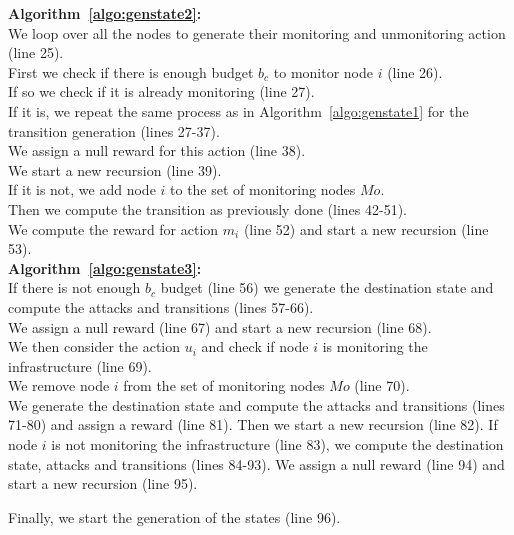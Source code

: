    
\textbf{Algorithm~\ref{algo:genstate2}:}\\
We loop over all the nodes to generate their monitoring and unmonitoring action (line 25).\\
First we check if there is enough budget $b_c$ to monitor node $i$ (line 26).\\
If so we check if it is already monitoring (line 27).\\
If it is, we repeat the same process as in Algorithm~\ref{algo:genstate1} for the transition generation (lines 27-37).\\
We assign a null reward for this action (line 38).\\
We start a new recursion (line 39).\\
If it is not, we add node $i$ to the set of monitoring nodes $Mo$.\\
Then we compute the transition as previously done (lines 42-51).\\
We compute the reward for action $m_i$ (line 52) and start a new recursion (line 53).\\

\textbf{Algorithm~\ref{algo:genstate3}:}\\
If there is not enough $b_c$ budget (line 56) we generate the destination state and compute the attacks and  transitions (lines 57-66).\\
We assign a null reward (line 67) and start a new recursion (line 68).\\
We then consider the action $u_i$ and check if node $i$ is monitoring the infrastructure (line 69). \\
We remove node $i$ from the set of monitoring nodes $Mo$ (line 70).\\
We generate the destination state and compute the attacks and transitions (lines 71-80) and assign a reward (line 81).
Then we start a new recursion (line 82).
If node $i$ is not monitoring the infrastructure (line 83), we compute the destination state, attacks and transitions (lines 84-93).
We assign a null reward (line 94) and start a new recursion (line 95).

Finally, we start the generation of the states (line 96).

